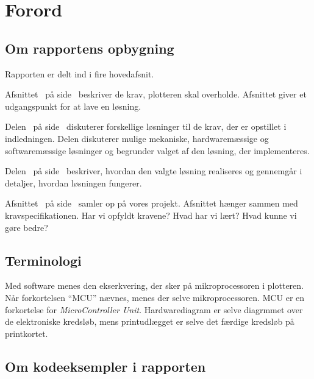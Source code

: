 \chapter{Forord}


\section{Om rapportens opbygning}

Rapporten er delt ind i fire hovedafsnit.

Afsnittet~ på side~\pageref{ch:indledning}
beskriver de krav, plotteren skal overholde. Afsnittet giver et
udgangspunkt for at lave en løsning.

Delen~ på side~\pageref{prt:design} diskuterer
forskellige løsninger til de krav, der er opstillet i
indledningen. Delen diskuterer mulige mekaniske, hardwaremæssige og
softwaremæssige løsninger og begrunder valget af den løsning, der
implementeres.

Delen~ på
side~\pageref{prt:implementering} beskriver, hvordan den valgte
løsning realiseres og gennemgår i detaljer, hvordan løsningen
fungerer.

Afsnittet~ på side~\pageref{ch:afslutning} samler op på vores projekt.
Afsnittet hænger sammen med kravspecifikationen. Har vi opfyldt kravene? Hvad har vi lært?
Hvad kunne vi gøre bedre?

\section{Terminologi}


Med software menes den ekserkvering, der sker på mikroprocessoren i
plotteren. Når forkortelsen \enquote{MCU} nævnes, menes der selve
mikroprocessoren. MCU er en forkortelse for \textit{MicroController
  Unit}. Hardwarediagram er selve diagrmmet over de elektroniske
kredsløb, mens printudlægget er selve det færdige kredsløb på
printkortet.

\section{Om kodeeksempler i rapporten}

